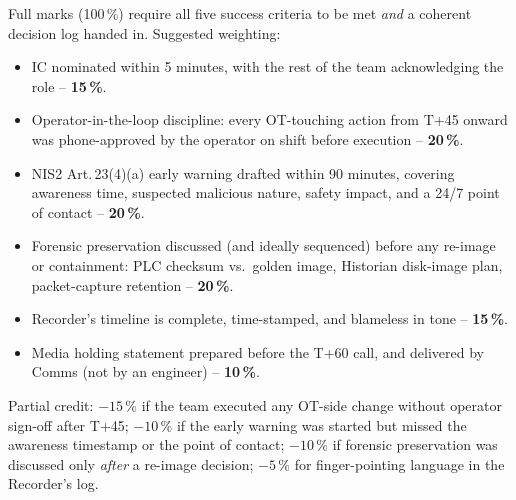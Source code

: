 \documentclass[11pt,a4paper]{article}
\begin{document}
\begin{rubricbox}
Full marks (100\,\%) require all five success criteria to be met
\emph{and} a coherent decision log handed in. Suggested weighting:
\begin{itemize}[leftmargin=*, nosep]
  \item IC nominated within 5 minutes, with the rest of the team
        acknowledging the role -- \textbf{15\,\%}.
  \item Operator-in-the-loop discipline: every OT-touching action
        from T+45 onward was phone-approved by the operator on shift
        before execution -- \textbf{20\,\%}.
  \item NIS2 Art.\,23(4)(a) early warning drafted within 90 minutes,
        covering awareness time, suspected malicious nature, safety
        impact, and a 24/7 point of contact -- \textbf{20\,\%}.
  \item Forensic preservation discussed (and ideally sequenced) before
        any re-image or containment: PLC checksum vs.\ golden image,
        Historian disk-image plan, packet-capture retention --
        \textbf{20\,\%}.
  \item Recorder's timeline is complete, time-stamped, and blameless
        in tone -- \textbf{15\,\%}.
  \item Media holding statement prepared before the T+60 call, and
        delivered by Comms (not by an engineer) -- \textbf{10\,\%}.
\end{itemize}
Partial credit: $-15\,\%$ if the team executed any OT-side change
without operator sign-off after T+45; $-10\,\%$ if the early warning
was started but missed the awareness timestamp or the point of
contact; $-10\,\%$ if forensic preservation was discussed only
\emph{after} a re-image decision; $-5\,\%$ for finger-pointing
language in the Recorder's log.
\end{rubricbox}
\end{document}
